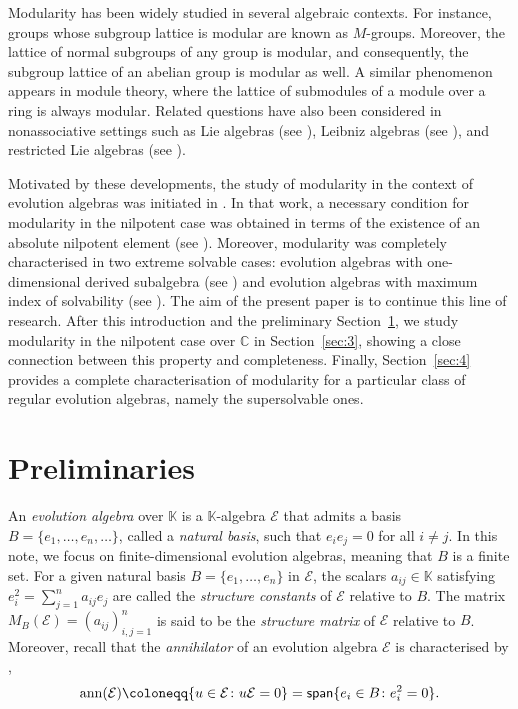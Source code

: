 \documentclass[12pt,reqno]{amsart}
\theoremstyle{plain}%
\theoremstyle{definition}
\theoremstyle{remark}
\DeclareMathOperator{\ann}{ann}
\DeclareMathOperator{\spa}{\textup{\textsf{span}}}
\numberwithin{equation}{section}
\begin{document}
Modularity has been widely studied in several algebraic contexts. For instance, groups whose subgroup lattice is modular are known as $M$-groups. Moreover, the lattice of normal subgroups of any group is modular, and consequently, the subgroup lattice of an abelian group is modular as well. A similar phenomenon appears in module theory, where the lattice of submodules of a module over a ring is always modular. Related questions have also been considered in nonassociative settings such as Lie algebras (see \cite{Ge_76,Ko_65}), Leibniz algebras (see \cite{ST_22}), and restricted Lie algebras (see \cite{MPS_21,PST_23}).


Motivated by these developments, the study of modularity in the context of evolution algebras was initiated in \cite{LPP_25}. In that work, a necessary condition for modularity in the nilpotent case was obtained in terms of the existence of an absolute nilpotent element (see \cite[Proposition~5.4]{LPP_25}). Moreover, modularity was completely characterised in two extreme solvable cases: evolution algebras with one-dimensional derived subalgebra (see \cite[Lemma~6.1]{LPP_25}) and evolution algebras with maximum index of solvability (see \cite[Corollary~6.11]{LPP_25}). The aim of the present paper is to continue this line of research. After this introduction and the preliminary Section~\ref{sec:2}, we study modularity in the nilpotent case over $\mathbb{C}$ in Section~\ref{sec:3}, showing a close connection between this property and completeness. Finally, Section~\ref{sec:4} provides a complete characterisation of modularity for a particular class of regular evolution algebras, namely the supersolvable ones.

\section{Preliminaries}\label{sec:2}
An \textit{evolution algebra} over $\mathbb{K}$ is a $\mathbb{K}$-algebra $\mathcal{E}$ that admits a basis $B=\{e_1,\dots,e_n,\dots\}$, called a \textit{natural basis}, such that $e_ie_j=0$ for all $i\neq j$. In this note, we focus on finite-dimensional evolution algebras, meaning that $B$ is a finite set. For a given natural basis $B=\{e_1,\dots,e_n\}$ in $\mathcal{E}$, the scalars $a_{ij}\in\mathbb{K}$ satisfying $e_i^2=\sum_{j=1}^na_{ij}e_j$ are called the \textit{structure constants} of $\mathcal{E}$ relative to $B$. The matrix $M_B(\mathcal{E})=(a_{ij})_{i,j=1}^n$ is said to be the \textit{structure matrix} of $\mathcal{E}$ relative to $B$. Moreover, recall that the \textit{annihilator} of an evolution algebra $\mathcal{E}$ is characterised by \cite[Proposition~1.5.3]{thesis_yolanda},
\[\ann(\mathcal{E})\coloneqq\{u\in\mathcal{E}\colon u\mathcal{E}=0\}=\spa\{e_i\in B\colon e_i^2=0\}.\]
\end{document}

